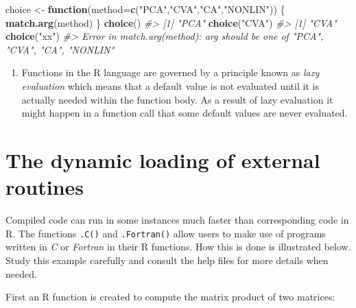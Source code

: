 \documentclass[
]{book}
\newenvironment{Shaded}{\begin{snugshade}}{\end{snugshade}}
\newcommand{\AttributeTok}[1]{\textcolor[rgb]{0.13,0.29,0.53}{#1}}
\newcommand{\CommentTok}[1]{\textcolor[rgb]{0.56,0.35,0.01}{\textit{#1}}}
\newcommand{\ControlFlowTok}[1]{\textcolor[rgb]{0.13,0.29,0.53}{\textbf{#1}}}
\newcommand{\FunctionTok}[1]{\textcolor[rgb]{0.13,0.29,0.53}{\textbf{#1}}}
\newcommand{\NormalTok}[1]{#1}
\newcommand{\OtherTok}[1]{\textcolor[rgb]{0.56,0.35,0.01}{#1}}
\newcommand{\StringTok}[1]{\textcolor[rgb]{0.31,0.60,0.02}{#1}}
\providecommand{\tightlist}{%
  \setlength{\itemsep}{0pt}\setlength{\parskip}{0pt}}
\begin{document}
\begin{Shaded}
\begin{Highlighting}[]
\NormalTok{choice }\OtherTok{\textless{}{-}} \ControlFlowTok{function}\NormalTok{(}\AttributeTok{method=}\FunctionTok{c}\NormalTok{(}\StringTok{"PCA"}\NormalTok{,}\StringTok{"CVA"}\NormalTok{,}\StringTok{"CA"}\NormalTok{,}\StringTok{"NONLIN"}\NormalTok{))}
\NormalTok{   \{ }\FunctionTok{match.arg}\NormalTok{(method)  \}}
\FunctionTok{choice}\NormalTok{()}
\CommentTok{\#\textgreater{} [1] "PCA"}
\FunctionTok{choice}\NormalTok{(}\StringTok{"CVA"}\NormalTok{)}
\CommentTok{\#\textgreater{} [1] "CVA"}
\FunctionTok{choice}\NormalTok{(}\StringTok{"xx"}\NormalTok{)}
\CommentTok{\#\textgreater{} Error in match.arg(method): \textquotesingle{}arg\textquotesingle{} should be one of "PCA", "CVA", "CA", "NONLIN"}
\end{Highlighting}
\end{Shaded}

\begin{enumerate}
\def\labelenumi{(\alph{enumi})}
\setcounter{enumi}{1}
\tightlist
\item
  Functions in the R language are governed by a principle known as \emph{{lazy evaluation}} which means that a default value is not evaluated until it is actually needed within the function body. As a result of lazy evaluation it might happen in a function call that some default values are never evaluated.
\end{enumerate}

\section{The dynamic loading of external routines}\label{the-dynamic-loading-of-external-routines}

Compiled code can run in some instances much faster than corresponding code in R. The functions \texttt{.C()} and \texttt{.Fortran()} allow users to make use of programs written in \emph{{C}} or \emph{{Fortran}} in their R functions. How this is done is illustrated below. Study this example carefully and consult the help files for more details when needed.

First an R function is created to compute the matrix product of two matrices:
\end{document}
